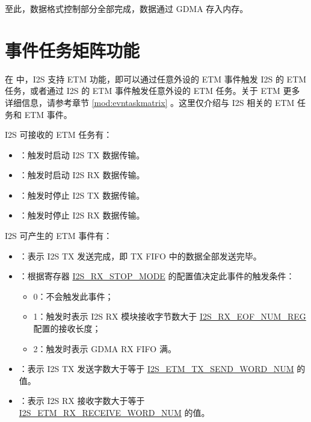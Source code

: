 \documentclass[main\_\_CN.tex]{subfiles}
\begin{document}
至此，数据格式控制部分全部完成，数据通过 GDMA 存入内存。

\section{事件任务矩阵功能}\label{sec:i2s-etm-func}

在 \chipname{} 中，I2S 支持 ETM 功能，即可以通过任意外设的 ETM 事件触发 I2S 的 ETM 任务，或者通过 I2S 的 ETM 事件触发任意外设的 ETM 任务。关于 ETM 更多详细信息，请参考章节 \ref{mod:evntaskmatrix} 。这里仅介绍与 I2S 相关的 ETM 任务和 ETM 事件。

I2S 可接收的 ETM 任务有：

\begin{itemize}
    \item \label{task:I2STASKSTARTTX}：触发时启动 I2S TX 数据传输。
    \item \label{task:I2STASKSTARTRX}：触发时启动 I2S RX 数据传输。
    \item \label{task:I2STASKSTOPTX}：触发时停止 I2S TX 数据传输。
    \item \label{task:I2STASKSTOPRX}：触发时停止 I2S RX 数据传输。
\end{itemize}

I2S 可产生的 ETM 事件有：

\begin{itemize}
    \item \label{evt:I2SEVTTXDONE}：表示 I2S TX 发送完成，即 TX FIFO 中的数据全部发送完毕。
    \item \label{evt:I2SEVTRXDONE}：根据寄存器 \hyperref[fielddesc:I2SRXSTOPMODE]{I2S\_RX\_STOP\_MODE} 的配置值决定此事件的触发条件：
    \begin{itemize}
        \item 0：不会触发此事件；
        \item 1：触发时表示 I2S RX 模块接收字节数大于 \hyperref[regdesc:I2SRXEOFNUMREG]{I2S\_RX\_EOF\_NUM\_REG} 配置的接收长度；
        \item 2：触发时表示 GDMA RX FIFO 满。
    \end{itemize}
    \item \label{evt:I2SEVTXWORDSSENT}：表示 I2S TX 发送字数大于等于 \hyperref[fielddesc:I2SETMTXSENDWORDNUM]{I2S\_ETM\_TX\_SEND\_WORD\_NUM} 的值。
    \item \label{evt:I2SEVTXWORDSRECEIVED}：表示 I2S RX 接收字数大于等于 \hyperref[fielddesc:I2SETMRXRECEIVEWORDNUM]{I2S\_ETM\_RX\_RECEIVE\_WORD\_NUM} 的值。
\end{itemize}
\end{document}
